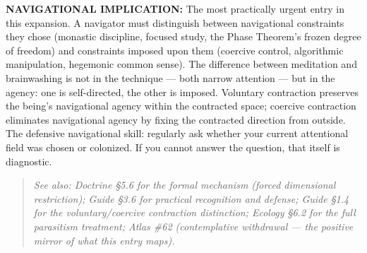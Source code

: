 \textbf{NAVIGATIONAL IMPLICATION:} The most practically urgent entry in this expansion. A navigator must distinguish between navigational constraints they chose (monastic discipline, focused study, the Phase Theorem's frozen degree of freedom) and constraints imposed upon them (coercive control, algorithmic manipulation, hegemonic common sense). The difference between meditation and brainwashing is not in the technique — both narrow attention — but in the agency: one is self-directed, the other is imposed. Voluntary contraction preserves the being's navigational agency within the contracted space; coercive contraction eliminates navigational agency by fixing the contracted direction from outside. The defensive navigational skill: regularly ask whether your current attentional field was chosen or colonized. If you cannot answer the question, that itself is diagnostic.


\begin{quote}
\itshape
\textit{See also: Doctrine §5.6 for the formal mechanism (forced dimensional restriction); Guide §3.6 for practical recognition and defense; Guide §1.4 for the voluntary/\allowbreak coercive contraction distinction; Ecology §6.2 for the full parasitism treatment; Atlas \#62 (contemplative withdrawal — the positive mirror of what this entry maps).}
\end{quote}


\bigskip\noindent\makebox[\textwidth]{\color{rulegray}\rule{5cm}{0.3pt}}\bigskip
